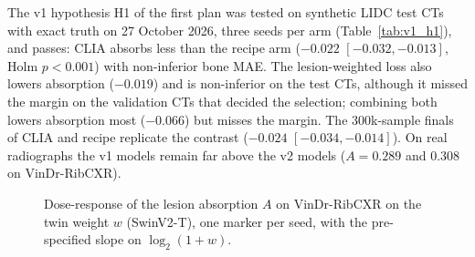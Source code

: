 The v1 hypothesis H1 of the first plan was tested on synthetic LIDC test CTs with exact truth on 27 October 2026, three seeds per arm
(Table~\ref{tab:v1_h1}), and passes: CLIA absorbs less than the recipe arm ($-0.022$ $[-0.032,-0.013]$, Holm $p<0.001$) with non-inferior bone
MAE. The lesion-weighted loss also lowers absorption ($-0.019$) and is non-inferior on the test CTs, although it missed the margin on the
validation CTs that decided the selection; combining both lowers absorption most ($-0.066$) but misses the margin. The 300k-sample finals of
CLIA and recipe replicate the contrast ($-0.024$ $[-0.034,-0.014]$). On real radiographs the v1 models remain far above the v2 models
($A=0.289$ and 0.308 on VinDr-RibCXR).
\begin{table}[htbp]
\centering\small
\caption{Dose-response of the lesion absorption on the twin weight (SwinV2-T family): seeds per weight, mean $A$ on VinDr-RibCXR and on the
Qure-projection test split, and the pre-specified slope with its image-cluster bootstrap interval.}
\label{tab:dose_response}
\end{table}
\begin{figure}[htbp]
\centering
{}
\caption{Dose-response of the lesion absorption $A$ on VinDr-RibCXR on the twin weight $w$ (SwinV2-T), one marker per seed, with the
pre-specified slope on $\log_2(1+w)$.}
\label{fig:dose_response}
\end{figure}
\begin{table}[htbp]
\centering\small
\caption{Ablation of the twin regulariser at $w=16$ (SwinV2-T, 300k samples, mean over seeds): one factor changed per row. Development
evidence: audit on all 75 SZCH images, bone PSNR$_{cal}$ on the 24 development pairs.}
\label{tab:ablation_twin}
\end{table}
\begin{table}[htbp]
\centering\small
\caption{First analysis plan, H1 (v1 family): lesion-aware arms against the recipe arm on synthetic LIDC test CTs with exact truth (three
seeds each), and the 300k-sample finals as a replication. Holm over the seven contrasts of the v1 ablation.}
\label{tab:v1_h1}
\end{table}

